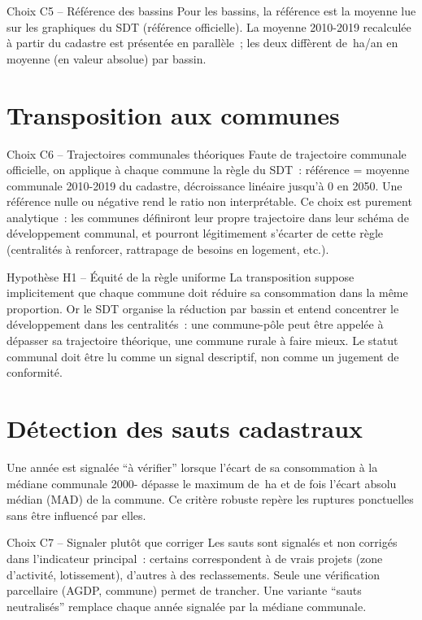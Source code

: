 \documentclass[11pt,a4paper]{report}
\newcommand{\ha}{\,ha}
\newcommand{\haan}{\,ha/an}
\begin{document}
\begin{choix}{Choix C5 -- Référence des bassins}
Pour les bassins, la référence est la moyenne lue sur les graphiques du SDT (référence officielle). La moyenne 2010-2019 recalculée à partir du cadastre est présentée en parallèle~; les deux diffèrent de \ValPrincEcartRef\haan{} en moyenne (en valeur absolue) par bassin.
\end{choix}

\section{Transposition aux communes}
\begin{choix}{Choix C6 -- Trajectoires communales théoriques}
Faute de trajectoire communale officielle, on applique à chaque commune la règle du SDT~: référence = moyenne communale 2010-2019 du cadastre, décroissance linéaire jusqu'à 0 en 2050. Une référence nulle ou négative rend le ratio non interprétable. Ce choix est purement analytique~: les communes définiront leur propre trajectoire dans leur schéma de développement communal, et pourront légitimement s'écarter de cette règle (centralités à renforcer, rattrapage de besoins en logement, etc.).
\end{choix}

\begin{attention}{Hypothèse H1 -- Équité de la règle uniforme}
La transposition suppose implicitement que chaque commune doit réduire sa consommation dans la même proportion. Or le SDT organise la réduction par bassin et entend concentrer le développement dans les centralités~: une commune-pôle peut être appelée à dépasser sa trajectoire théorique, une commune rurale à faire mieux. Le statut communal doit être lu comme un signal descriptif, non comme un jugement de conformité.
\end{attention}

\section{Détection des sauts cadastraux}
\label{sec:methode_sauts}
Une année est signalée \enquote{à vérifier} lorsque l'écart de sa consommation à la médiane communale 2000-\AnneeFinObs{} dépasse le maximum de \SautSeuil\ha{} et de \SautK{} fois l'écart absolu médian (MAD) de la commune. Ce critère robuste repère les ruptures ponctuelles sans être influencé par elles.

\begin{choix}{Choix C7 -- Signaler plutôt que corriger}
Les sauts sont signalés et non corrigés dans l'indicateur principal~: certains correspondent à de vrais projets (zone d'activité, lotissement), d'autres à des reclassements. Seule une vérification parcellaire (AGDP, commune) permet de trancher. Une variante \enquote{sauts neutralisés} remplace chaque année signalée par la médiane communale.
\end{choix}
\end{document}
